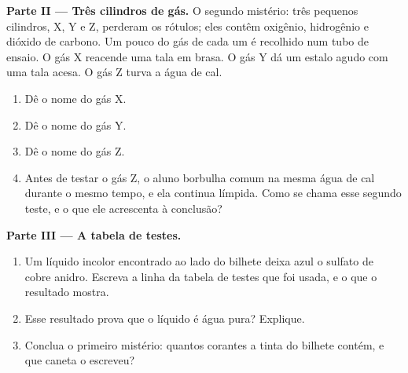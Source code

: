 \begin{problem}
\medskip
\noindent\textbf{Parte II --- Três cilindros de gás.}
O segundo mistério: três pequenos cilindros, X, Y e Z, perderam os
rótulos; eles contêm oxigênio, hidrogênio e dióxido de carbono. Um pouco
do gás de cada um é recolhido num tubo de ensaio. O gás X reacende uma
tala em brasa. O gás Y dá um estalo agudo com uma tala acesa. O gás Z
turva a água de cal.
\begin{enumerate}[resume]
  \item Dê o nome do gás X.
  \item Dê o nome do gás Y.
  \item Dê o nome do gás Z.
  \item Antes de testar o gás Z, o aluno borbulha  comum na mesma água
        de cal durante o mesmo tempo, e ela continua límpida. Como se
        chama esse segundo teste, e o que ele acrescenta à conclusão?
\end{enumerate}

\medskip
\noindent\textbf{Parte III --- A tabela de testes.}
\begin{enumerate}[resume]
  \item Um líquido incolor encontrado ao lado do bilhete deixa azul o
        sulfato de cobre anidro. Escreva a linha da tabela de testes que
        foi usada, e o que o resultado mostra.
  \item Esse resultado prova que o líquido é água pura? Explique.
  \item Conclua o primeiro mistério: quantos corantes a tinta do bilhete
        contém, e que caneta o escreveu?
\end{enumerate}
\end{problem}
